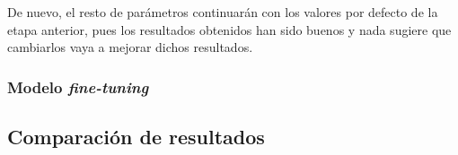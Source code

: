             \medskip

            \noindent De nuevo, el resto de parámetros continuarán con los valores por defecto de la etapa anterior, pues los resultados obtenidos han sido buenos y nada sugiere que cambiarlos vaya a mejorar dichos resultados.

        \subsubsection{Modelo \textit{fine-tuning}}
    \subsection{Comparación de resultados}
\endinput



